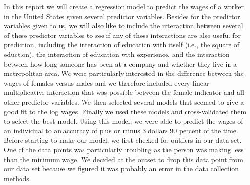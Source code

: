\documentclass[12pt,a4paper,twoside]{article}
\begin{document}
In this report we will create a regression model to predict the wages of a worker in the United States given several predictor variables. Besides for the predictor variables given to us, we will also like to include the interaction between several of these predictor variables to see if any of these interactions are also useful for prediction, including the interaction of education with itself (i.e., the square of eduction), the interaction of education with experience, and the interaction between how long someone has been at a company and whether they live in a metropolitan area. We were particularly interested in the difference between the wages of females versus males and we therefore included every linear multiplicative interaction that was possible between the female indicator and all other predictor variables. We then selected several models that seemed to give a good fit to the log wages. Finally we used these models and cross-validated them to select the best model. Using this model, we were able to predict the wages of an individual to an accuracy of plus or minus 3 dollars 90 percent of the time. \\     
	
Before starting to make our model, we first checked for outliers in our data set. One of the data points was particularly troubling as the person was making less than the minimum wage. We decided at the outset to drop this data point from our data set because we figured it was probably an error in the data collection methods.\\
	
\end{document}

